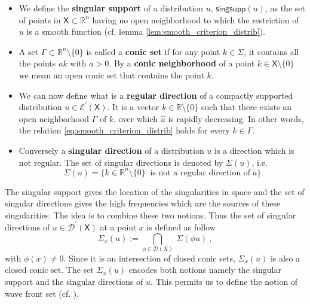 \documentclass[11pt]{book}
\newcommand{\singsupp}{\mathsf{singsupp}}
\newcommand{\Dcal}{\mathcal{D}}
\newcommand{\Ecal}{\mathcal{E}}
\newcommand{\Rbb}{\mathbb{R}}
\newcommand{\Xsf}{\mathsf{X}}
\theoremstyle{break}
\begin{document}
\begin{itemize}
\setlength\itemsep{0pt}
%
%
%
%
\item We define the \textbf{singular support} of a distribution $u$, $\singsupp(u)$, as the set of points in $\Xsf \subset \Rbb^n$ having no open neighborhood to which the restriction of $u$ is a smooth function (cf. lemma \ref{lem:smooth_criterion_distrib}). 
%
%
%
%
\item A set $\Gamma \subset \Rbb^n \setminus \{0\}$ is called a \textbf{conic set} if for any point $k \in \Sigma$, it contains all the points $a k$ with $a > 0$. By a \textbf{conic neighborhood} of a point $k \in \Xsf \setminus \{0\}$ we mean an open conic set that contains the point $k$. 
%
%
%
%
\item We can now define what is a \textbf{regular direction} of a compactly supported distribution $u\in\Ecal^\prime(\Xsf)$. It is a vector $k \in \Rbb\setminus\{0\}$ such that there exists an open neighborhood $\Gamma$ of $k$, over which $\hat{u}$ is rapidly decreasing. In other words, the relation \eqref{eq:smooth_criterion_distrib} holds for every $k \in \Gamma$.\par%
%
\item
Conversely a \textbf{singular direction} of a distribution $u$ is a direction which is not regular. The set of singular directions is denoted by $\Sigma (u)$, i.e.
%
\begin{equation}
\Sigma(u) = \bigg\{ k \in \Rbb^n \setminus \{0\} \ \mbox{ is not a regular direction of} \ u  \bigg\} 
\label{eq:sing_direction}
\end{equation}
%
%
%
%
\end{itemize}


The singular support gives the location of the singularities in space and the set of singular directions gives the high frequencies which are the sources of these singularities. The idea is to combine these two notions. Thus the set of singular directions of $u\in\Dcal^\prime(\Xsf)$ at a point $x$ is defined as follow
%
\begin{equation*}
\Sigma_x(u) := \underset{\phi \in \Dcal(X)}{\bigcap} \ \Sigma(\phi u) \ , 
\end{equation*}
%
with $\phi(x) \neq 0$. Since it is an intersection of closed conic sets, $\Sigma_x(u)$ is also a closed conic set. The set $\Sigma_x(u)$ encodes both notions namely the singular support and the singular directions of $u$. This permits us to define the notion of wave front set (cf. \cite{HORMANDER_1990}).
\end{document}
